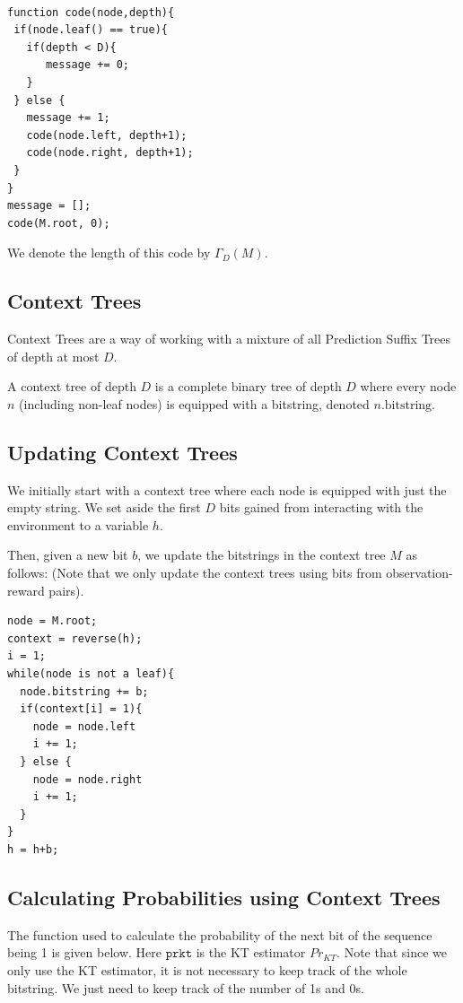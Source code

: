 \documentclass[12pt,a4paper,twoside]{article}
\theoremstyle{upright}
\begin{document}
\begin{verbatim}

function code(node,depth){
 if(node.leaf() == true){
   if(depth < D){
      message += 0;
   }
 } else {
   message += 1;    
   code(node.left, depth+1);
   code(node.right, depth+1);
 }
}
message = [];
code(M.root, 0);
\end{verbatim}

We denote the length of this code by $\Gamma_D(M)$.

\subsection{Context Trees}

Context Trees are a way of working with a mixture of all Prediction Suffix Trees of depth at most $D$.


\dfn

A context tree of depth $D$ is a complete binary tree of depth $D$ where every 
node $n$ (including non-leaf nodes) is equipped with a bitstring, denoted $n\text{.bitstring}$.


\subsection{Updating Context Trees}

We initially start with a context tree where each node is equipped with just the empty string.
We set aside the first $D$ bits gained from interacting with the environment to a variable $h$.

Then, given a new bit $b$, we update the bitstrings in the context tree $M$ as follows:
(Note that we only update the context trees using bits from observation-reward pairs).

\begin{verbatim}
node = M.root;
context = reverse(h);
i = 1;
while(node is not a leaf){
  node.bitstring += b;
  if(context[i] = 1){
    node = node.left
    i += 1;
  } else {
    node = node.right
    i += 1;
  }
}
h = h+b;
\end{verbatim}
 

\subsection{Calculating Probabilities using Context Trees}

The function used to calculate the probability of the next bit of the sequence being 1 is given below.
Here $\texttt{prkt}$ is the KT estimator $Pr_{KT}$. Note that since we only use the KT estimator, it is
not necessary to keep track of the whole bitstring. We just need to keep track of the number of 1s and 0s.
\end{document}
